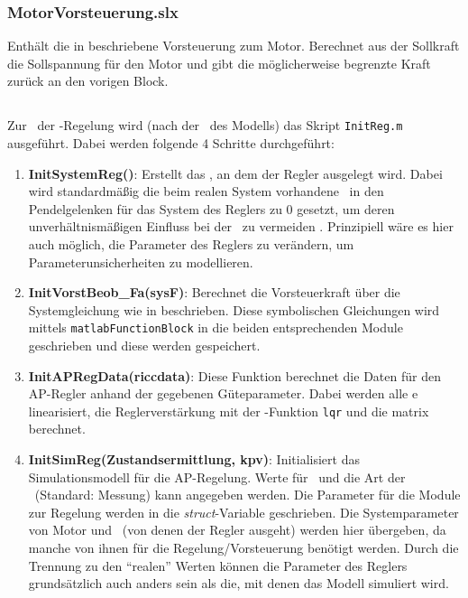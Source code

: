 \subsubsection{MotorVorsteuerung.slx}
Enthält die in  beschriebene Vorsteuerung zum Motor.
Berechnet aus der Sollkraft die Sollspannung für den Motor und gibt die möglicherweise begrenzte Kraft zurück an den vorigen Block.

\subsection{\init}

Zur \init\ der \ap-Regelung wird (nach der \init\ des Modells) das Skript \texttt{InitReg.m} ausgeführt.
Dabei werden folgende 4 Schritte durchgeführt:
\begin{enumerate}
	\item \textbf{InitSystemReg()}: Erstellt das \zrm, an dem der Regler ausgelegt wird. Dabei wird standardmäßig die beim realen System vorhandene \crb\ in den Pendelgelenken für das System des Reglers zu 0 gesetzt, um deren unverhältnismäßigen Einfluss bei der \lin\ zu vermeiden . Prinzipiell wäre es hier auch möglich, die Parameter des Reglers zu verändern, um Parameterunsicherheiten zu modellieren.
	\item \textbf{InitVorstBeob\_Fa(sysF)}: Berechnet die Vorsteuerkraft über die Systemgleichung wie in  beschrieben. Diese symbolischen Gleichungen wird mittels \texttt{matlabFunctionBlock} in die beiden entsprechenden Module geschrieben und diese werden gespeichert. 
	\item \textbf{InitAPRegData(riccdata)}: Diese Funktion berechnet die Daten für den AP-Regler anhand der gegebenen Güteparameter. Dabei werden alle \ap e linearisiert, die Reglerverstärkung mit der \ml-Funktion \texttt{lqr} und die \beob matrix berechnet.
	\item \textbf{InitSimReg(Zustandsermittlung, kpv)}: Initialisiert das Simulationsmodell für die AP-Regelung. Werte für \kpv\ und die Art der \ze\ (Standard: Messung) kann angegeben werden. Die Parameter für die Module zur Regelung werden in die \emph{struct}-Variable  geschrieben. Die Systemparameter von Motor und \spd\ (von denen der Regler ausgeht) werden hier übergeben, da manche von ihnen für die Regelung/Vorsteuerung benötigt werden. Durch die Trennung zu den "`realen"' Werten  können die Parameter des Reglers grundsätzlich auch anders sein als die, mit denen das Modell simuliert wird.
\end{enumerate}



